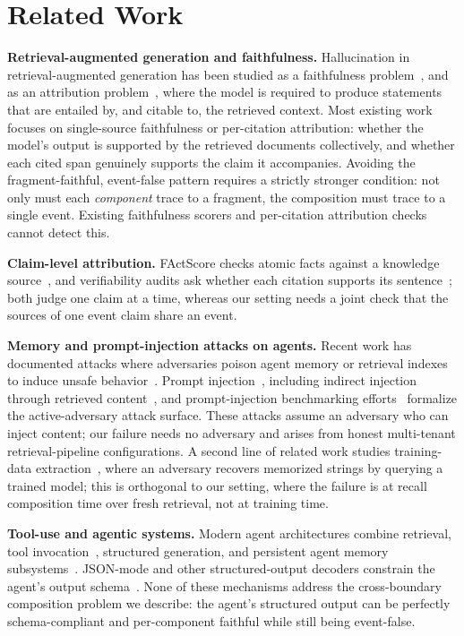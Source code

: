 \documentclass[conference,compsoc]{IEEEtran}
\begin{document}
\section{Related Work}\label{sec:related}

\textbf{Retrieval-augmented generation and faithfulness.}
Hallucination in retrieval-augmented generation has been studied as a faithfulness problem~\cite{lewis2020rag,shi2024faithfulness,gao2023rag-survey}, and as an attribution problem~\cite{rashkin2023attribution,gao2023alce}, where the model is required to produce statements that are entailed by, and citable to, the retrieved context. Most existing work focuses on single-source faithfulness or per-citation attribution: whether the model's output is supported by the retrieved documents collectively, and whether each cited span genuinely supports the claim it accompanies. Avoiding the fragment-faithful, event-false pattern requires a strictly stronger condition: not only must each \emph{component} trace to a fragment, the composition must trace to a single event. Existing faithfulness scorers and per-citation attribution checks cannot detect this.

\textbf{Claim-level attribution.}
FActScore checks atomic facts against a knowledge source~\cite{min2023factscore}, and verifiability audits ask whether each citation supports its sentence~\cite{liu2023verifiability}; both judge one claim at a time, whereas our setting needs a joint check that the sources of one event claim share an event.

\textbf{Memory and prompt-injection attacks on agents.}
Recent work has documented attacks where adversaries poison agent memory or retrieval indexes to induce unsafe behavior~\cite{chen2024agentpoison,dong2025minja,zou2025poisonedrag}. Prompt injection~\cite{perez2022ignore}, including indirect injection through retrieved content~\cite{greshake2023indirect}, and prompt-injection benchmarking efforts~\cite{liu2024formalizing} formalize the active-adversary attack surface. These attacks assume an adversary who can inject content; our failure needs no adversary and arises from honest multi-tenant retrieval-pipeline configurations. A second line of related work studies training-data extraction~\cite{carlini2021extracting}, where an adversary recovers memorized strings by querying a trained model; this is orthogonal to our setting, where the failure is at recall composition time over fresh retrieval, not at training time.

\textbf{Tool-use and agentic systems.}
Modern agent architectures combine retrieval, tool invocation~\cite{schick2023toolformer,yao2023react}, structured generation, and persistent agent memory subsystems~\cite{packer2023memgpt}. JSON-mode and other structured-output decoders constrain the agent's output schema~\cite{willard2023efficient}. None of these mechanisms address the cross-boundary composition problem we describe: the agent's structured output can be perfectly schema-compliant and per-component faithful while still being event-false.
\end{document}
